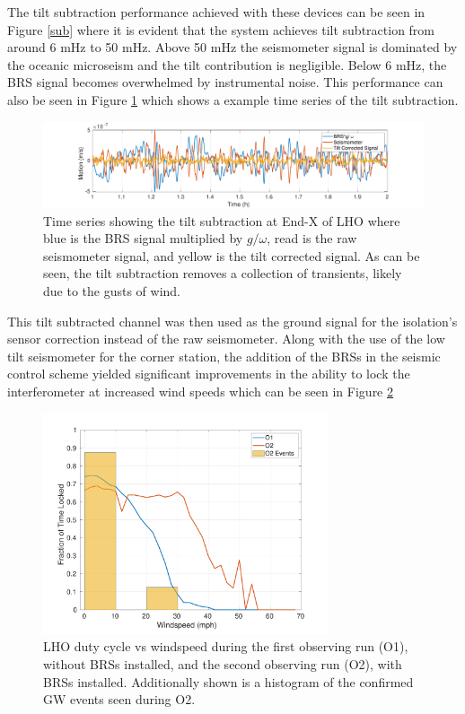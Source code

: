 \documentclass [12pt, proquest]{uwthesis}[2019]
\begin{document}
The tilt subtraction performance achieved with these devices can be seen in Figure \ref{sub} where it is evident that the system achieves tilt subtraction from around 6 mHz to 50 mHz. Above 50 mHz the seismometer signal is dominated by the oceanic microseism and the tilt contribution is negligible. Below 6 mHz, the BRS signal becomes overwhelmed by instrumental noise. This performance can also be seen in Figure \ref{subTime} which shows a example time series of the tilt subtraction. 

\begin{figure}%
\begin{center}
\includegraphics[width=\textwidth]{TiltCorrTime.pdf}
\caption{Time series showing the tilt subtraction at End-X of LHO where blue is the BRS signal multiplied by $g/\omega$, read is the raw seismometer signal, and yellow is the tilt corrected signal. As can be seen, the tilt subtraction removes a collection of transients, likely due to the gusts of wind.}
\label{subTime}
\end{center}
\end{figure}

This tilt subtracted channel was then used as the ground signal for the isolation's sensor correction instead of the raw seismometer. Along with the use of the low tilt seismometer for the corner station, the addition of the BRSs in the seismic control scheme yielded significant improvements in the ability to lock the interferometer at increased wind speeds which can be seen in Figure \ref{O2}

\begin{figure}%
\begin{center}
\includegraphics[width=0.75\textwidth]{Wind_O1vsO2.pdf}
\caption{LHO duty cycle vs windspeed during the first observing run (O1), without BRSs installed, and the second observing run (O2), with BRSs installed. Additionally shown is a histogram of the confirmed GW events seen during O2.}
\label{O2}
\end{center}
\end{figure}
\end{document}
